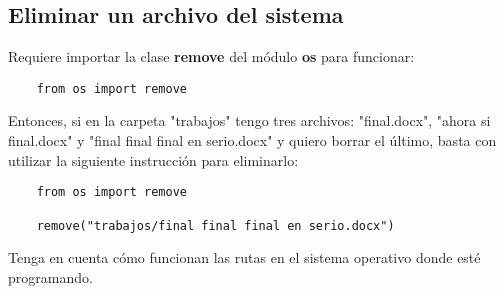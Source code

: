 \subsection{Eliminar un archivo del sistema}

Requiere importar la clase \textbf{remove} del módulo \textbf{os} para funcionar:
\begin{lstlisting}
    from os import remove
\end{lstlisting}

Entonces, si en la carpeta "trabajos" tengo tres archivos: "final.docx", "ahora si final.docx" y "final final final en serio.docx" y quiero borrar el último, basta con utilizar la siguiente instrucción para eliminarlo:
\begin{lstlisting}
    from os import remove

    remove("trabajos/final final final en serio.docx")
\end{lstlisting}

Tenga en cuenta cómo funcionan las rutas en el sistema operativo donde esté programando.
